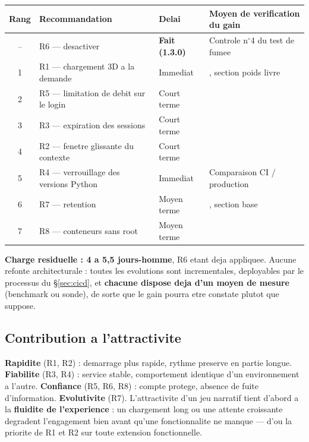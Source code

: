 \footnotesize
\begin{tabularx}{\linewidth}{@{}c L{4.6cm} L{2.1cm} X@{}}
\toprule
\textbf{Rang} & \textbf{Recommandation} & \textbf{Delai} & \textbf{Moyen de verification du gain} \\
\midrule
-- & R6 --- desactiver  & \textcolor{VertOk}{\textbf{Fait (1.3.0)}} & Controle n$^\circ$4 du test de fumee \\
1 & R1 --- chargement 3D a la demande & Immediat & , section poids livre \\
2 & R5 --- limitation de debit sur le login & Court terme &  \\
3 & R3 --- expiration des sessions & Court terme &  \\
4 & R2 --- fenetre glissante du contexte & Court terme &  \\
5 & R4 --- verrouillage des versions Python & Immediat & Comparaison CI / production \\
6 & R7 --- retention  & Moyen terme & , section base \\
7 & R8 --- conteneurs sans root & Moyen terme &  \\
\bottomrule
\end{tabularx}
\normalsize

\textbf{Charge residuelle : 4 a 5,5 jours-homme}, R6 etant deja appliquee. Aucune refonte
architecturale : toutes les evolutions sont incrementales, deployables par le processus du
\S\ref{sec:cicd}, et \textbf{chacune dispose deja d'un moyen de mesure} (benchmark ou sonde), de
sorte que le gain pourra etre constate plutot que suppose.

\subsection{Contribution a l'attractivite}

\textbf{Rapidite} (R1, R2) : demarrage plus rapide, rythme preserve en partie longue.
\textbf{Fiabilite} (R3, R4) : service stable, comportement identique d'un environnement a l'autre.
\textbf{Confiance} (R5, R6, R8) : compte protege, absence de fuite d'information.
\textbf{Evolutivite} (R7). L'attractivite d'un jeu narratif tient d'abord a la \textbf{fluidite de
l'experience} : un chargement long ou une attente croissante degradent l'engagement bien avant
qu'une fonctionnalite ne manque --- d'ou la priorite de R1 et R2 sur toute extension fonctionnelle.

